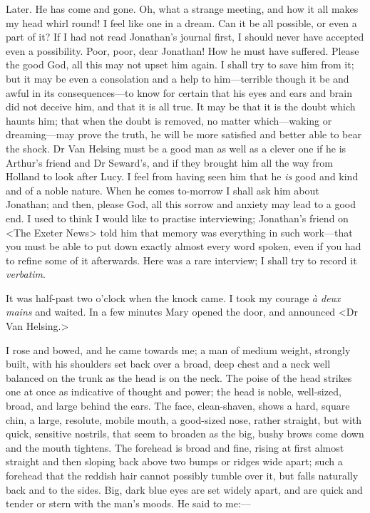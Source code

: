 \begin{diary}{Later.}
He has come and gone. Oh, what a strange meeting, and how it all makes my head whirl round! I feel like one in a dream. Can it be all possible, or even a part of it? If I had not read Jonathan's journal first, I should never have accepted even a possibility. Poor, poor, dear Jonathan! How he must have suffered. Please the good God, all this may not upset him again. I shall try to save him from it; but it may be even a consolation and a help to him—terrible though it be and awful in its consequences—to know for certain that his eyes and ears and brain did not deceive him, and that it is all true. It may be that it is the doubt which haunts him; that when the doubt is removed, no matter which—waking or dreaming—may prove the truth, he will be more satisfied and better able to bear the shock. Dr Van Helsing must be a good man as well as a clever one if he is Arthur's friend and Dr Seward's, and if they brought him all the way from Holland to look after Lucy. I feel from having seen him that he \textit{is} good and kind and of a noble nature. When he comes to-morrow I shall ask him about Jonathan; and then, please God, all this sorrow and anxiety may lead to a good end. I used to think I would like to practise interviewing; Jonathan's friend on <The Exeter News> told him that memory was everything in such work—that you must be able to put down exactly almost every word spoken, even if you had to refine some of it afterwards. Here was a rare interview; I shall try to record it \textit{verbatim}.

It was half-past two o'clock when the knock came. I took my courage \textit{à deux mains} and waited. In a few minutes Mary opened the door, and announced <Dr Van Helsing.>

I rose and bowed, and he came towards me; a man of medium weight, strongly built, with his shoulders set back over a broad, deep chest and a neck well balanced on the trunk as the head is on the neck. The poise of the head strikes one at once as indicative of thought and power; the head is noble, well-sized, broad, and large behind the ears. The face, clean-shaven, shows a hard, square chin, a large, resolute, mobile mouth, a good-sized nose, rather straight, but with quick, sensitive nostrils, that seem to broaden as the big, bushy brows come down and the mouth tightens. The forehead is broad and fine, rising at first almost straight and then sloping back above two bumps or ridges wide apart; such a forehead that the reddish hair cannot possibly tumble over it, but falls naturally back and to the sides. Big, dark blue eyes are set widely apart, and are quick and tender or stern with the man's moods. He said to me:—


\end{diary}
